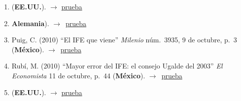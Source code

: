 \documentclass[12 pt, letter]{article}
\newenvironment{CitasMiTrabajo}{
    \begin{footnotesize}
    \begin{enumerate}[label={\footnotesize\emph{cita~\arabic*}},ref=\arabic*] %
        \setlength{\itemsep}{.1\itemsep}
        \setlength{\parskip}{.1\parskip}
    }{\end{enumerate}\end{footnotesize}}
\begin{document}
        \begin{CitasMiTrabajo}

        \item {} (\textbf{EE.UU.}). $\rightarrow$ \href{https://doi.org/10.1080/13510347.2019.1641797}{prueba}
          
        \item {} {\textbf{Alemania}}). $\rightarrow$~\href{https://github.com/emagar/cv/blob/master/citasMiTrab/magarEtalIFEDinam/lara2015.pdf}{prueba}

        \item Puig, C. (2010)
        ``El
        IFE que viene'' \emph{Milenio} n\'um.\ 3935, 9 de octubre, p.~3 (\textbf{M\'exico}). $\rightarrow$~\href{https://github.com/emagar/cv/blob/master/citasMiTrab/magarEtalIFEDinam/puig.pdf}{prueba}

        \item Rub\'i, M. (2010)
        ``Mayor error del IFE: el consejo Ugalde del 2003'' \emph{El Economista} 11 de octubre, p.~44 (\textbf{M\'exico}). $\rightarrow$~\href{https://github.com/emagar/cv/blob/master/citasMiTrab/magarEtalIFEDinam/rubi.pdf}{prueba}

        \item {} (\textbf{EE.UU.}). $\rightarrow$ \href{https://doi.org/10.1089/elj.2018.0512}{prueba}

        \label{ncites:magar.estevez.rosas.2010} %

        \end{CitasMiTrabajo}







\end{document}

